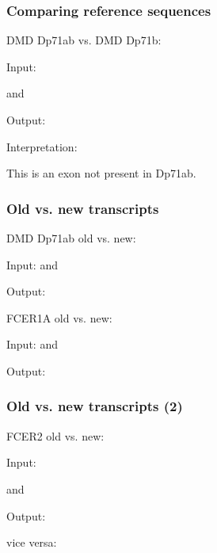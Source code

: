 \documentclass[slidestop]{beamer}
\begin{document}
\begin{frame}
  \frametitle{Comparing reference sequences}

  DMD Dp71ab vs. DMD Dp71b:
  \bigskip

  Input:

   and 
  \bigskip
  \pause

  Output:

  \bigskip

  Interpretation:

  This is an exon not present in Dp71ab.
\end{frame}

\begin{frame}
  \frametitle{Old vs. new transcripts}

  DMD Dp71ab old vs. new:
  \bigskip

  Input:  and 
  \bigskip

  Output: \bt{[3308A>G;4288A>G]}
  \bigskip
  \bigskip
  \bigskip
  \pause

  FCER1A old vs. new:
  \bigskip

  Input:  and 
  \bigskip

  Output: 
\end{frame}


\begin{frame}
  \frametitle{Old vs. new transcripts (2)}

  FCER2 old vs. new:
  \bigskip

  Input:

   and 
  \bigskip
  \pause

  Output:

  \smallskip
  \pause

  vice versa:

\end{frame}
\end{document}
